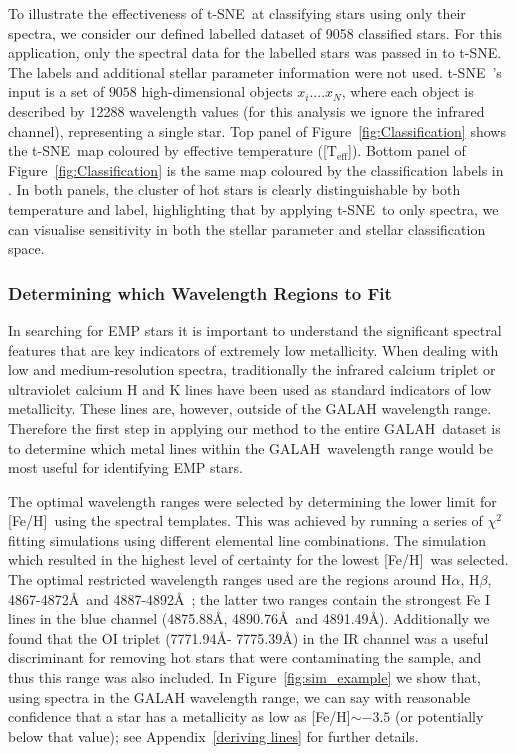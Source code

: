 \documentclass[]{aastex631}
\newcommand{\g}{GALAH\xspace}
\newcommand{\ts}{t-SNE\xspace}
\newcommand{\emps}{EMP stars\xspace}
\newcommand{\Ha}{H$\alpha$}
\newcommand{\Hb}{H$\beta$}
\newcommand{\feh}{[Fe/H]\xspace}
\newcommand{\ci}{$\chi^2$\xspace}
\begin{document}
To illustrate the effectiveness of \ts \ at classifying stars using only their spectra, we  consider our defined labelled dataset of 9058 classified stars. For this application, only the spectral data for the labelled stars was passed in to \ts. The labels and additional stellar parameter information were not used. \ts \ 's input is a set of $9058 $ high-dimensional objects $x_{i}.... x_{N}$, where each object is described by 12288 wavelength values (for this analysis we ignore the infrared channel), representing a single star.
 Top panel of Figure~\ref{fig:Classification} shows the \ts \ map coloured by effective temperature ([$\mathrm{T_{eff}}$]). Bottom panel of Figure~\ref{fig:Classification} is the same map coloured by the classification labels in \cite{traven_galah_2017}. In both panels, the cluster of hot stars is clearly distinguishable by both temperature and label, highlighting that by applying \ts \ to only spectra, we can visualise sensitivity in both the stellar parameter and  stellar classification space.




\subsubsection{Determining which Wavelength Regions to Fit}\label{optimal_wavelength}

In searching for \emps it is important to understand the significant spectral features that are key indicators of extremely low metallicity. When dealing with low and medium-resolution spectra, traditionally the infrared calcium triplet or ultraviolet calcium H and K lines have been used as standard indicators of low metallicity.
These lines are, however, outside of the GALAH wavelength range.
Therefore the first step in applying our method to the entire \g \ dataset is to determine which metal lines within the \g \ wavelength range would be most useful for identifying \emps.



The optimal wavelength ranges were selected by determining the lower limit for \feh \ using the spectral templates. This was achieved by running a series of \ci \-fitting simulations using different elemental line combinations. The simulation which resulted in the highest level of certainty for the lowest \feh \ was selected. The optimal restricted wavelength ranges used are the regions around \Ha, \Hb , 4867-4872\AA \  and 4887-4892\AA \ ; the latter two ranges contain the strongest Fe I lines in the blue channel (4875.88\AA , 4890.76\AA\ and 4891.49\AA). Additionally we found that the OI triplet (7771.94\AA - 7775.39\AA) in the IR channel was a useful discriminant for removing hot stars that were contaminating the sample, and thus this range was also included.
In Figure~\ref{fig:sim_example} we show that, using spectra in the GALAH wavelength range, we can say with reasonable confidence that a star has a metallicity as low as \feh $\sim -3.5$ (or potentially below that value); see Appendix~\ref{deriving lines} for further details. 
\end{document}
